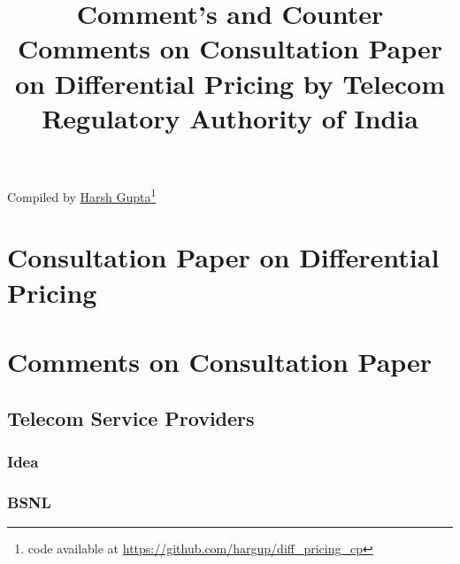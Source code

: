 \documentclass{article}
\title{Comment's and Counter Comments on Consultation Paper on Differential Pricing by Telecom Regulatory
Authority of India}
\date{}
\begin{document}
\maketitle

\centerline{Compiled by \href{http://hargup.in}{Harsh Gupta}\footnote{code
    available at
\href{https://github.com/hargup/diff_pricing_cp}{https://github.com/hargup/diff\_pricing\_cp}}}

\newpage

\tableofcontents
\newpage



%

\section{Consultation Paper on Differential Pricing}


\newpage

\section{Comments on Consultation Paper}

\subsection{Telecom Service Providers}
\subsubsection{Idea}


\subsubsection{BSNL}

\end{document}
